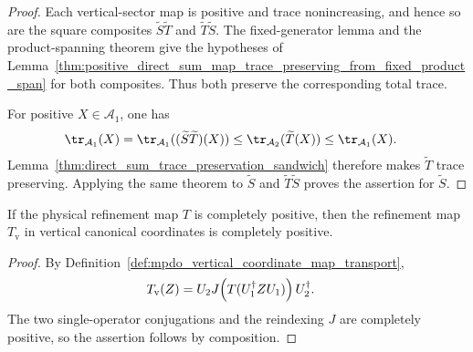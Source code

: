 \begin{proof}\leanok
    Each vertical-sector map is positive and trace nonincreasing, and hence so are
    the square composites $\widetilde S\widetilde T$ and
    $\widetilde T\widetilde S$. The fixed-generator lemma and the
    product-spanning theorem give the hypotheses of
    Lemma~\ref{thm:positive_direct_sum_map_trace_preserving_from_fixed_product_span}
    for both composites. Thus both preserve the corresponding total trace.

    For positive $X\in\mathcal A_1$, one has
    \begin{align}
        \tr_{\mathcal A_1}(X)
         & =\tr_{\mathcal A_1}
        ((\widetilde S\widetilde T)(X))
        \leq\tr_{\mathcal A_2}(\widetilde T(X))
        \leq\tr_{\mathcal A_1}(X).
        \notag
    \end{align}
    Lemma~\ref{thm:direct_sum_trace_preservation_sandwich} therefore makes
    $\widetilde T$ trace preserving. Applying the same theorem to
    $\widetilde S$ and $\widetilde T\widetilde S$ proves the assertion for
    $\widetilde S$.
\end{proof}

\begin{lemma}
    \label{lem:mpdo_transport_t_vertical_coordinates_cp}
    \leanok
    If the physical refinement map $T$ is completely positive, then the
    refinement map $T_{\mathrm v}$ in vertical canonical coordinates is
    completely positive.
\end{lemma}

\begin{proof}\leanok
    By Definition~\ref{def:mpdo_vertical_coordinate_map_transport},
    \begin{align}
        T_{\mathrm v}(Z)
         & =U_2J\!\left(T(U_1^\dagger ZU_1)\right)U_2^\dagger.
        \notag
    \end{align}
    The two single-operator conjugations and the reindexing $J$ are completely
    positive, so the assertion follows by composition.
\end{proof}

